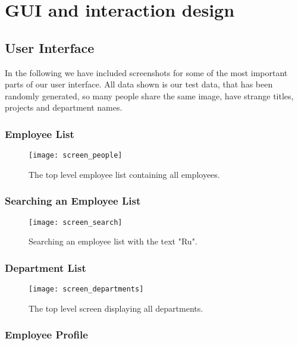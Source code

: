 \section{GUI and interaction design}

\subsection{User Interface}
\label{sec:gui_ui}

In the following we have included screenshots for some of the most
important parts of our user interface. All data shown is our test
data, that has been randomly generated, so many people share the same
image, have strange titles, projects and department names.

\subsubsection{Employee List}

\begin{figure}[H]
    \centerline{ \texttt{[image: screen\_people]} }
    \caption{The top level employee list containing all employees.}
    \label{fig:screen_people}
\end{figure}

\subsubsection{Searching an Employee List}

\begin{figure}[H]
    \centerline{ \texttt{[image: screen\_search]} }
    \caption{Searching an employee list with the text "Ru".}
    \label{fig:screen_search}
\end{figure}

\subsubsection{Department List}

\begin{figure}[H]
    \centerline{ \texttt{[image: screen\_departments]} }
    \caption{The top level screen displaying all departments.}
    \label{fig:screen_departments}
\end{figure}

\subsubsection{Employee Profile}

